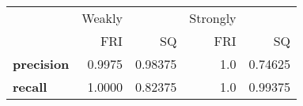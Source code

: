 \begin{tabular}{lrrrr}
\toprule
{} &  Weakly &          & Strongly &          \\
{} &     FRI &       SQ &      FRI &       SQ \\
\midrule
\textbf{precision} &  0.9975 &  0.98375 &      1.0 &  0.74625 \\
\textbf{recall   } &  1.0000 &  0.82375 &      1.0 &  0.99375 \\
\bottomrule
\end{tabular}
